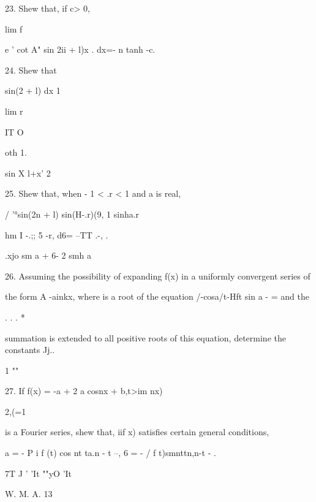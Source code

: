 23. Shew that, if c> 0,

lim f

e ' cot A" sin 2ii + l)x . dx=- n tanh -c\pi.


24. Shew that

sin(2 + l) dx 1

lim r

IT O

oth 1.


sin X l+x' 2

25. Shew that, when - 1 < .r < 1 and a is real,

/ '°sin(2n + l) sin(H-.r)(9, 1 sinha.r

hm I -.;; 5 -r, d6= --TT .-, .

  .xjo sm a + 6- 2 smh a


26. Assuming the possibility of expanding f(x) in a uniformly
convergent series of

the form A -ainkx, where is a root of the equation /-cosa/t-Hft sin a
- = and the

  . . . *

summation is extended to all positive roots of this equation,
determine the constants Jj..


1 ""

27. If f(x) = -a + 2 a cosnx + b,t>im nx)

2,(=1

is a Fourier series, shew that, iif x) satisfies certain general
conditions,

a = - P i f (t) cos nt ta.n - t --, 6 = - / f t)smnttn,n-t - .

7T J ' 'It ""yO 'It


W. M. A. 13
